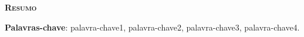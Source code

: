 
\vspace*{45pt}
\begin{flushleft}
	{\Large \textbf{\scshape{Resumo}}}
\end{flushleft}
\vspace*{10pt}


\amostradetexto


\vspace*{20pt}

\noindent \textbf{Palavras-chave}:
palavra-chave1, palavra-chave2, palavra-chave3, palavra-chave4.

